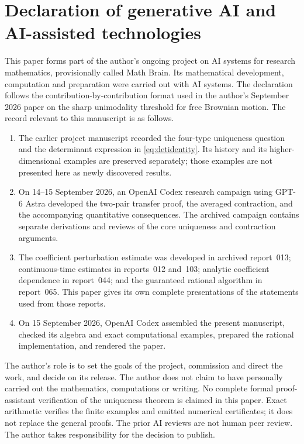 \documentclass[11pt]{amsart}
\theoremstyle{definition}
\begin{document}
\section*{Declaration of generative AI and AI-assisted technologies}
This paper forms part of the author's ongoing project on AI systems for research mathematics, provisionally called Math Brain. Its mathematical development, computation and preparation were carried out with AI systems. The declaration follows the contribution-by-contribution format used in the author's September 2026 paper on the sharp unimodality threshold for free Brownian motion. The record relevant to this manuscript is as follows.
\begin{enumerate}
\item The earlier project manuscript recorded the four-type uniqueness question and the determinant expression in \eqref{eq:detidentity}. Its history and its higher-dimensional examples are preserved separately; those examples are not presented here as newly discovered results.
\item On 14--15 September 2026, an OpenAI Codex research campaign using GPT-6 Astra developed the two-pair transfer proof, the averaged contraction, and the accompanying quantitative consequences. The archived campaign contains separate derivations and reviews of the core uniqueness and contraction arguments.
\item The coefficient perturbation estimate was developed in archived report~013; continuous-time estimates in reports~012 and~103; analytic coefficient dependence in report~044; and the guaranteed rational algorithm in report~065. This paper gives its own complete presentations of the statements used from those reports.
\item On 15 September 2026, OpenAI Codex assembled the present manuscript, checked its algebra and exact computational examples, prepared the rational implementation, and rendered the paper.
\end{enumerate}
The author's role is to set the goals of the project, commission and direct the work, and decide on its release. The author does not claim to have personally carried out the mathematics, computations or writing. No complete formal proof-assistant verification of the uniqueness theorem is claimed in this paper. Exact arithmetic verifies the finite examples and emitted numerical certificates; it does not replace the general proofs. The prior AI reviews are not human peer review. The author takes responsibility for the decision to publish.
\end{document}
